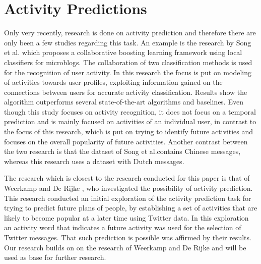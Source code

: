 \section{Activity Predictions}
Only very recently, research is done on activity prediction and therefore there are only been a few studies regarding this task. An example is the research by Song et al. \cite{activity_colab} which proposes a collaborative boosting learning framework using local classifiers for microblogs. The collaboration of two classification methods is used for the recognition of user activity. In this research the focus is put on modeling of activities towards user profiles, exploiting information gained on the connections between users for accurate activity classification. Results show the algorithm outperforms several state-of-the-art algorithms and baselines. Even though this study focuses on activity recognition, it does not focus on a temporal prediction and is mainly focused on activities of an individual user, in contrast to the focus of this research, which is put on trying to identify future activities and focuses on the overall popularity of future activities. Another contrast between the two research is that the dataset of Song et al.contains Chinese messages, whereas this research uses a dataset with Dutch messages.

The research which is closest to the research conducted for this paper is that of Weerkamp and De Rijke \cite{Weerkamp}, who investigated the possibility of activity prediction. This research conducted an initial exploration of the activity prediction task for trying to predict future plans of people, by establishing a set of activities that are likely to become popular at a later time using Twitter data. In this exploration an activity word that indicates a future activity was used for the selection of Twitter messages. That such prediction is possible was affirmed by their results. Our research builds on on the research of Weerkamp and De Rijke and will be used as base for further research.
